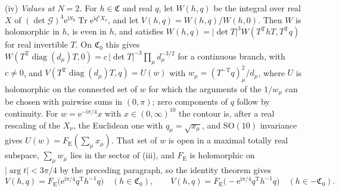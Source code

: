 (iv) \emph{Values at \(N=2\).} For \(h\in\mathfrak C\) and real \(q\), let \(W(h,q)\) be the integral over real \(X\) of \((\det\mathcal G)^4\mathrm e^{\mathrm iS_{\mathrm b}}\operatorname{Tr}\mathrm e^{\mathrm iq^\nu X_\nu}\), and let \(V(h,q)=W(h,q)/W(h,0)\). Then \(W\) is holomorphic in \(h\), is even in \(h\), and satisfies \(W(h,q)=|\det T|^3W(T^{\mathrm T}hT,T^{\mathrm T}q)\) for real invertible \(T\). On \(\mathfrak C_0\) this gives \(W(T^{\mathrm T}\operatorname{diag}(d_\mu)T,0)=c\,|\det T|^{-3}\prod_\mu d_\mu^{-3/2}\) for a continuous branch, with \(c\neq0\), and \(V(T^{\mathrm T}\operatorname{diag}(d_\mu)T,q)=U(w)\) with \(w_\mu=(T^{-\mathrm T}q)_\mu^2/d_\mu\), where \(U\) is holomorphic on the connected set of \(w\) for which the arguments of the \(1/w_\mu\) can be chosen with pairwise sums in \((0,\pi)\); zero components of \(q\) follow by continuity. For \(w=\mathrm e^{-\mathrm i\pi/4}x\) with \(x\in(0,\infty)^{10}\) the contour is, after a real rescaling of the \(X_\nu\), the Euclidean one with \(q_\mu=\sqrt{x_\mu}\), and \(\mathrm{SO}(10)\) invariance gives \(U(w)=F_{\mathrm E}(\sum_\mu x_\mu)\). That set of \(w\) is open in a maximal totally real subspace, \(\sum_\mu w_\mu\) lies in the sector of (iii), and \(F_{\mathrm E}\) is holomorphic on \(|\arg t|<3\pi/4\) by the preceding paragraph, so the identity theorem gives
\[
V(h,q)=F_{\mathrm E}\bigl(\mathrm e^{\mathrm i\pi/4}q^{\mathrm T}h^{-1}q\bigr)\quad(h\in\mathfrak C_0),\qquad V(h,q)=F_{\mathrm E}\bigl(-\mathrm e^{\mathrm i\pi/4}q^{\mathrm T}h^{-1}q\bigr)\quad(h\in-\mathfrak C_0).
\]

